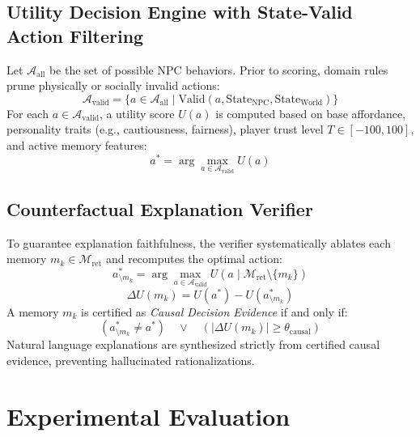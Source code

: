 \documentclass[conference]{IEEEtran}
\begin{document}
\subsection{Utility Decision Engine with State-Valid Action Filtering}
Let $\mathcal{A}_{\text{all}}$ be the set of possible NPC behaviors. Prior to scoring, domain rules prune physically or socially invalid actions:
\begin{equation}
\mathcal{A}_{\text{valid}} = \{a \in \mathcal{A}_{\text{all}} \mid \text{Valid}(a, \text{State}_{\text{NPC}}, \text{State}_{\text{World}})\}
\end{equation}
For each $a \in \mathcal{A}_{\text{valid}}$, a utility score $U(a)$ is computed based on base affordance, personality traits (e.g., cautiousness, fairness), player trust level $T \in [-100, 100]$, and active memory features:
\begin{equation}
a^* = \arg\max_{a \in \mathcal{A}_{\text{valid}}} U(a)
\end{equation}

\subsection{Counterfactual Explanation Verifier}
To guarantee explanation faithfulness, the verifier systematically ablates each memory $m_k \in \mathcal{M}_{\text{ret}}$ and recomputes the optimal action:
\begin{equation}
a^*_{\setminus m_k} = \arg\max_{a \in \mathcal{A}_{\text{valid}}} U(a \mid \mathcal{M}_{\text{ret}} \setminus \{m_k\})
\end{equation}
\begin{equation}
\Delta U(m_k) = U(a^*) - U(a^*_{\setminus m_k})
\end{equation}
A memory $m_k$ is certified as \textit{Causal Decision Evidence} if and only if:
\begin{equation}
(a^*_{\setminus m_k} \neq a^*) \quad \lor \quad (|\Delta U(m_k)| \ge \theta_{\text{causal}})
\end{equation}
Natural language explanations are synthesized strictly from certified causal evidence, preventing hallucinated rationalizations.

\section{Experimental Evaluation}
\end{document}
